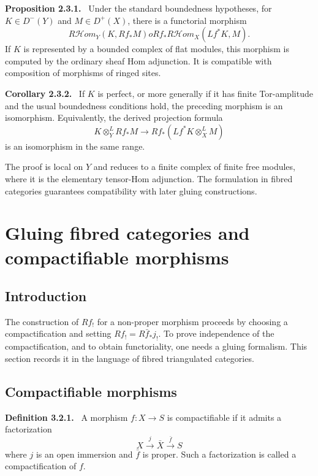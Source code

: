 \documentclass[12pt]{article}
\newenvironment{statement}[1]{\par\medskip\noindent\textbf{#1.}\ }{\par\medskip}
\begin{document}
\begin{statement}{Proposition 2.3.1}
Under the standard boundedness hypotheses, for \(K\in D^-(Y)\) and \(M\in D^+(X)\), there is a functorial morphism
\[
R\mathcal Hom_Y(K,Rf_*M)	o Rf_*R\mathcal Hom_X(Lf^*K,M).
\]
If \(K\) is represented by a bounded complex of flat modules, this morphism is computed by the ordinary sheaf Hom adjunction. It is compatible with composition of morphisms of ringed sites.
\end{statement}

\begin{statement}{Corollary 2.3.2}
If \(K\) is perfect, or more generally if it has finite Tor-amplitude and the usual boundedness conditions hold, the preceding morphism is an isomorphism. Equivalently, the derived projection formula
\[
K\otimes_Y^L Rf_*M\to Rf_*(Lf^*K\otimes_X^L M)
\]
is an isomorphism in the same range.
\end{statement}

The proof is local on \(Y\) and reduces to a finite complex of finite free modules, where it is the elementary tensor-Hom adjunction. The formulation in fibred categories guarantees compatibility with later gluing constructions.

\section{Gluing fibred categories and compactifiable morphisms}

\subsection{Introduction}

The construction of \(Rf_!\) for a non-proper morphism proceeds by choosing a compactification and setting \(Rf_!=R\bar f_*j_!\). To prove independence of the compactification, and to obtain functoriality, one needs a gluing formalism. This section records it in the language of fibred triangulated categories.

\subsection{Compactifiable morphisms}

\begin{statement}{Definition 3.2.1}
A morphism \(f:X\to S\) is compactifiable if it admits a factorization
\[
X\xrightarrow{j}\bar X\xrightarrow{\bar f}S
\]
where \(j\) is an open immersion and \(\bar f\) is proper. Such a factorization is called a compactification of \(f\).
\end{statement}
\end{document}
